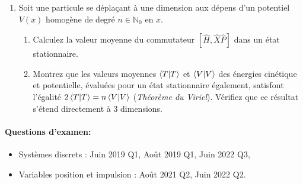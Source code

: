 \begin{enumerate}
\begin{enumerate}
\end{enumerate}
\item Soit une particule se déplaçant à une dimension aux dépens d'un potentiel $V(x)$ homogène de degré $n\in\mathbb N_0$ en $x$. 
\begin{enumerate}
\item Calculez la valeur moyenne du commutateur $[\hat H,\hat X\hat P]$ dans un état stationnaire.
\item Montrez que les valeurs moyennes $\braket{T}$ et $\braket{V}$ des énergies cinétique et potentielle, évaluées pour un état stationnaire également, satisfont l'égalité $2\braket{T}=n\braket{V}$ (\textit{Théorème du Viriel}). Vérifiez que ce résultat s'étend directement à 3 dimensions.
\end{enumerate}
\end{enumerate}

\paragraph{Questions d'examen:} 
\begin{itemize}[label=\textbullet]
	\item Systèmes discrets : Juin 2019 Q1, Août 2019 Q1, Juin 2022 Q3,
	\item Variables position et impulsion : Août 2021 Q2, Juin 2022 Q2.
\end{itemize}
